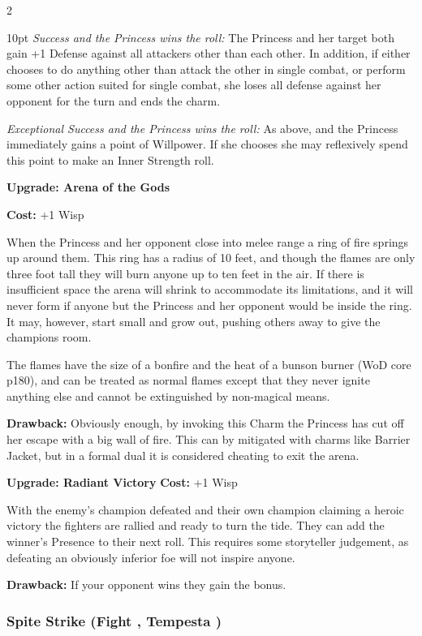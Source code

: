 \begin{multicols}{2}
\begin{myindentpar}{10pt}
\emph{Success and the Princess wins the roll:} The Princess and her target both gain +1 Defense against all attackers other than each other. In addition, if either chooses to do anything other than attack the other in single combat, or perform some other action suited for single combat, she loses all defense against her opponent for the turn and ends the charm.

\emph{Exceptional Success and the Princess wins the roll:} As above, and the Princess immediately gains a point of Willpower. If she chooses she may reflexively spend this point to make an Inner Strength roll.

\textbf{Upgrade: Arena of the Gods}

\textbf{Cost:} +1 Wisp

When the Princess and her opponent close into melee range a ring of fire springs up around them. This ring has a radius of 10 feet, and though the flames are only three foot tall they will burn anyone up to ten feet in the air. If there is insufficient space the arena will shrink to accommodate its limitations, and it will never form if anyone but the Princess and her opponent would be inside the ring. It may, however, start small and grow out, pushing others away to give the champions room.

The flames have the size of a bonfire and the heat of a bunson burner (WoD core p180), and can be treated as normal flames except that they never ignite anything else and cannot be extinguished by non-magical means.

\textbf{Drawback:} Obviously enough, by invoking this Charm the Princess has cut off her escape with a big wall of fire. This can by mitigated with charms like Barrier Jacket, but in a formal dual it is considered cheating to exit the arena.

\textbf{Upgrade: Radiant Victory}
\textbf{Cost:} +1 Wisp

With the enemy's champion defeated and their own champion claiming a heroic victory the fighters are rallied and ready to turn the tide. They can add the winner's Presence to their next roll. This requires some storyteller judgement, as defeating an obviously inferior foe will not inspire anyone. 

\textbf{Drawback:} If your opponent wins they gain the bonus.\end{myindentpar}

\subsubsection*{Spite Strike (Fight \textbullet\textbullet, Tempesta \textbullet)}


\end{multicols}
